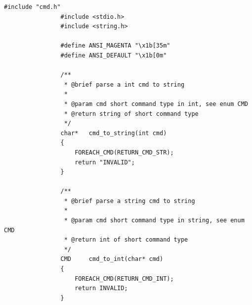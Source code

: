 \documentclass{article}
\begin{document}
            \begin{Verbatim}[gobble=8]
                #include "cmd.h"
                #include <stdio.h>
                #include <string.h>
                
                #define ANSI_MAGENTA "\x1b[35m"
                #define ANSI_DEFAULT "\x1b[0m"
                
                /**
                 * @brief parse a int cmd to string
                 * 
                 * @param cmd short command type in int, see enum CMD
                 * @return string of short command type
                 */
                char*   cmd_to_string(int cmd)
                {
                    FOREACH_CMD(RETURN_CMD_STR);
                    return "INVALID";
                }
                
                /**
                 * @brief parse a string cmd to string
                 * 
                 * @param cmd short command type in string, see enum CMD
                 * @return int of short command type
                 */
                CMD     cmd_to_int(char* cmd)
                {
                    FOREACH_CMD(RETURN_CMD_INT);
                    return INVALID;
                }
                

\end{Verbatim}
\end{document}
